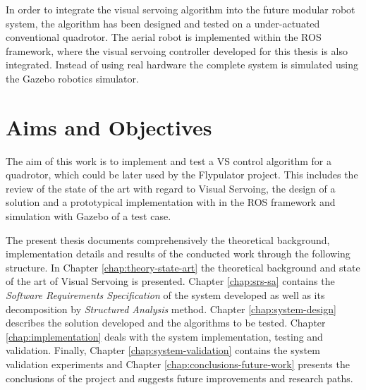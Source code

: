 
In order to integrate the visual servoing algorithm into the future modular robot system, the algorithm has been designed and tested on a under-actuated conventional quadrotor. The aerial robot is implemented within the ROS framework, where the visual servoing controller developed for this thesis is also integrated. Instead of using real hardware the complete system is simulated using the Gazebo robotics simulator.


\section{Aims and Objectives}
\label{sec:aims-objectives}

The aim of this work is to implement and test a VS control algorithm for a quadrotor, which could be later used by the Flypulator project. This includes the review of the state of the art with regard to Visual Servoing, the design of a solution and a prototypical implementation with in the ROS framework and simulation with Gazebo of a test case.

The present thesis documents comprehensively the theoretical background, implementation details and results of the conducted work through the following structure. In Chapter \ref{chap:theory-state-art} the theoretical background and state of the art of Visual Servoing is presented. Chapter \ref{chap:srs-sa} contains the \emph{Software Requirements Specification} of the system developed as well as its decomposition by \emph{Structured Analysis} method. Chapter \ref{chap:system-design} describes the solution developed and the algorithms to be tested. Chapter \ref{chap:implementation} deals with the system implementation, testing and validation. Finally, Chapter \ref{chap:system-validation} contains the system validation experiments and Chapter \ref{chap:conclusions-future-work} presents the conclusions of the project and suggests future improvements and research paths.

